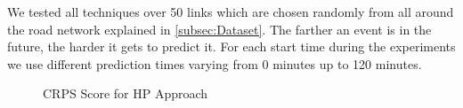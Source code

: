 We tested all techniques over 50 links which are chosen randomly from all around the road network explained in \cref{subsec:Dataset}. The farther an event is in the future, the harder it gets to predict it. For each start time during the experiments we use different prediction times varying from 0 minutes up to 120 minutes.

\begin{figure}[h]
	\centering
	\caption{CRPS Score for HP Approach}\label{fig:HP}
\end{figure}

